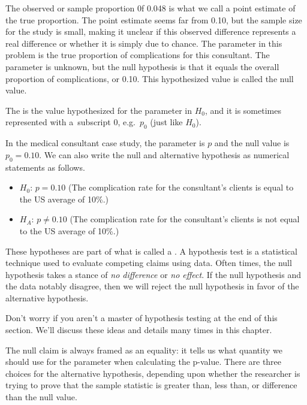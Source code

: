 The observed or sample proportion 0f 0.048 is what we call a point estimate of the true proportion. The point estimate seems far from 0.10, but the sample size for the study is small, making it unclear if this observed difference represents a real difference or whether it is simply due to chance.  The parameter in this problem is the true proportion of complications for this consultant.  The parameter is unknown, but the null hypothesis is that it equals the overall proportion of complications, or 0.10.  This hypothesized value is called the null value.

\begin{termBox}{
The  is the value hypothesized for the parameter in $H_0$, and it is sometimes represented with a~subscript 0, e.g.~$p_0$ (just like $H_0$).}
\end{termBox}

In the medical consultant case study, the parameter is $p$ and the null value is $p_0 = 0.10$.  We can also write the null and alternative hypothesis as numerical statements as follows.
\begin{itemize}
\item $H_0$: $p=0.10$ (The complication rate for the consultant's clients is equal to the US average of 10\%.)
\item $H_A$: $p \neq 0.10$ (The complication rate for the consultant's clients is not equal to the US average of 10\%.)
\end{itemize}

\begin{termBox}{
These hypotheses are part of what is called a . A hypothesis test is a statistical technique used to evaluate competing claims using data. Often times, the null hypothesis takes a stance of \emph{no difference} or \emph{no effect}. If the null hypothesis and the data notably disagree, then we will reject the null hypothesis in favor of the alternative hypothesis. \vspace{3mm}

Don't worry if you aren't a master of hypothesis testing at the end of this section. We'll discuss these ideas and details many times in this chapter.}
\end{termBox}

The null claim is always framed as an equality: it tells us what quantity we should use for the parameter when calculating the p-value.  There are three choices for the alternative hypothesis, depending upon whether the researcher is trying to prove that the sample statistic is greater than, less than, or difference than the null value.

